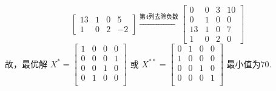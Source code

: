 \begin{solution}
$$\begin{bmatrix}
        13 & 1  & 0  & 5 \\
        1  & 0  & 2  & -2
    \end{bmatrix}
    \xrightarrow{\text{第4列去除负数}}
    \begin{bmatrix}
        0  & 0  & 3  & 10\\
        0  & 1  & 0  & 0 \\
        13 & 1  & 0  & 7 \\
        1  & 0  & 2  & 0
    \end{bmatrix}$$
    故，最优解
    $X^{*}=\begin{bmatrix}
        1  & 0  & 0  & 0  \\
        0  & 0  & 0  & 1  \\
        0  & 0  & 1  & 0  \\
        0  & 1  & 0  & 0  \\
    \end{bmatrix}$
    或
    $X^{**}=\begin{bmatrix}
        0  & 1  & 0  & 0  \\
        1  & 0  & 0  & 0  \\
        0  & 0  & 1  & 0  \\
        0  & 0  & 0  & 1  \\
    \end{bmatrix}$
    最小值为70.
\end{solution}